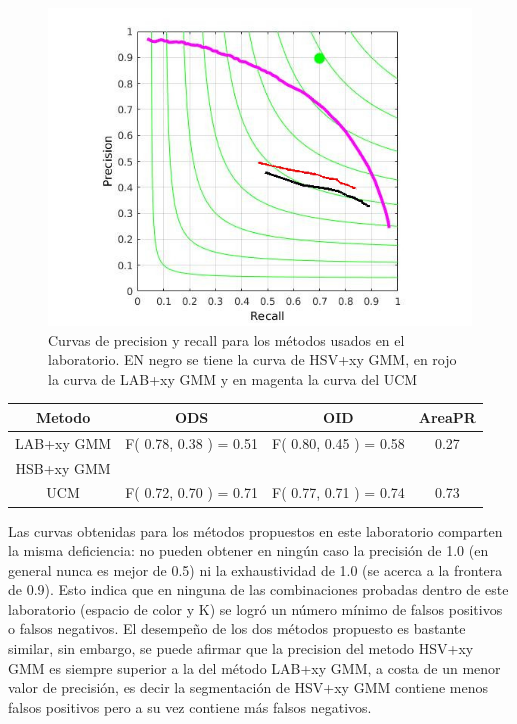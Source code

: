 \documentclass[10pt,twocolumn,letterpaper]{article}
\begin{document}
\begin{figure}
\begin{center}
\includegraphics[width=1.15\linewidth]
                {img/metods.jpg}
\end{center}
\caption{Curvas de precision y recall para los métodos usados en el laboratorio. EN negro se tiene la curva de HSV+xy GMM, en rojo la curva de LAB+xy GMM y en magenta la curva del UCM}
\label{fig:plot}
\end{figure}

\begin{table}[t]
\centering
\begin{tabular}{c | c | c | c }
Metodo & ODS & OID & AreaPR  \\
\hline	
LAB+xy GMM & F( 0.78, 0.38 ) = 0.51  & F( 0.80, 0.45 ) = 0.58 & 0.27 \\
HSB+xy GMM &  &  &  \\
UCM & F( 0.72, 0.70 ) = 0.71  & F( 0.77, 0.71 ) = 0.74 &  0.73\\
\end{tabular}
\label{table:thetable}
\end{table}


Las curvas obtenidas para los métodos propuestos en este laboratorio comparten la misma deficiencia:  no pueden obtener en ningún caso la precisión de 1.0 (en general nunca es mejor de 0.5) ni la exhaustividad de 1.0 (se acerca a la frontera de 0.9). Esto indica que en ninguna de las combinaciones probadas dentro de este laboratorio (espacio de color y K) se logró un número mínimo de falsos positivos o falsos negativos. El desempeño de los dos métodos propuesto es bastante similar, sin embargo, se puede afirmar que la precision del metodo HSV+xy GMM es siempre superior a la del método LAB+xy GMM, a costa de un menor valor de precisión, es decir la segmentación de HSV+xy GMM contiene menos falsos positivos pero a su vez contiene más falsos negativos.
\end{document}
